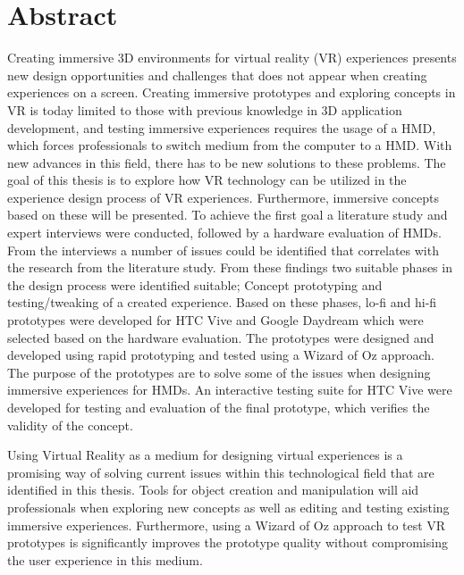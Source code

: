 \chapter{Abstract}
Creating immersive 3D environments for virtual reality (VR) experiences presents new design opportunities and challenges that does not appear when creating experiences on a screen. Creating immersive prototypes and exploring concepts in VR is today limited to those with previous knowledge in 3D application development, and testing immersive experiences requires the usage of a HMD, which forces professionals to switch medium from the computer to a HMD. With new advances in this field, there has to be new solutions to these problems. The goal of this thesis is to explore how VR technology can be utilized in the experience design process of VR experiences. Furthermore, immersive concepts based on these will be presented. To achieve the first goal a literature study and expert interviews were conducted, followed by a hardware evaluation of HMDs. From the interviews a number of issues could be identified that correlates with the research from the literature study. From these findings two suitable phases in the design process were identified suitable; Concept prototyping and testing/tweaking of a created experience. Based on these phases, lo-fi and hi-fi prototypes were developed for HTC Vive and Google Daydream which were selected based on the hardware evaluation. The prototypes were designed and developed using rapid prototyping and tested using a Wizard of Oz approach. The purpose of the prototypes are to solve some of the issues when designing immersive experiences for HMDs. An interactive testing suite for HTC Vive were developed for testing and evaluation of the final prototype, which verifies the validity of the concept.

Using Virtual Reality as a medium for designing virtual experiences is a promising way of solving current issues within this technological field that are identified in this thesis. Tools for object creation and manipulation will aid professionals when exploring new concepts as well as editing and testing existing immersive experiences. Furthermore, using a Wizard of Oz approach to test VR prototypes is significantly improves the prototype quality without compromising the user experience in this medium.
